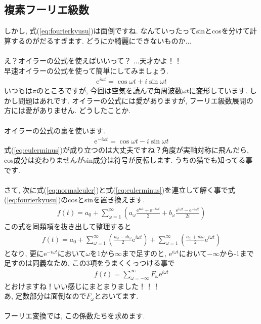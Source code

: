 \documentclass[11pt,a4paper]{jreport}
\begin{document}
\subsection{複素フーリエ級数}
しかし, 式(\ref{eq:fourierkyusu})は面倒ですね. なんていったってsinとcosを分けて計算するのがだるすぎます. どうにか綺麗にできないものか...\\
\\
え？オイラーの公式を使えばいいって？ ...天才かよ！！
\\
早速オイラーの公式を使って簡単にしてみましょう. 
\begin{eqnarray}
\mathrm{e}^{i\omega t} = \cos\omega t + i\sin\omega t
\label{eq:normaleuler}
\end{eqnarray}
いつもは$\pi$のところですが, 今回は空気を読んで角周波数$\omega t$に変形しています. しかし問題はあれです. オイラーの公式には愛がありますが, フーリエ級数展開の方には愛がありません. どうしたことか.\\
\\
オイラーの公式の裏を使います.
\begin{eqnarray}
\mathrm{e}^{-i\omega t} = \cos\omega t - i\sin\omega t
\label{eq:eulerminus}
\end{eqnarray}
式(\ref{eq:eulerminus})が成り立つのは大丈夫ですね？角度が実軸対称に飛んだら, cos成分は変わりませんがsin成分は符号が反転します. うちの猫でも知ってる事です.\\
\\
さて, 次に式(\ref{eq:normaleuler})と式(\ref{eq:eulerminus})を連立して解く事で式(\ref{eq:fourierkyusu})のcosとsinを置き換えます. \\
\begin{eqnarray}
f(t) = a_0 + \sum_{\omega=1}^\infty {(a_\omega \frac{\mathrm{e}^{i\omega t}+\mathrm{e}^{-i\omega t}}{2} + b_\omega \frac{\mathrm{e}^{i\omega t} - \mathrm{e}^{-i\omega t}}{2i})}
\label{eq:complexfourier}
\end{eqnarray}
この式を同類項を抜き出して整理すると
\begin{eqnarray}
f(t) = a_0 + \sum_{\omega=1}^\infty {(\frac{a_\omega - ib_\omega}{2}\mathrm{e}^{i\omega t})} + \sum_{\omega=1}^\infty {(\frac{a_\omega + ib\omega}{2}\mathrm{e}^{i\omega t})}
\label{eq:complexfourierkai}
\end{eqnarray}
となり, 更に$\mathrm{e}^{-i\omega t}$において$\omega$を1から$\infty$まで足すのと, $\mathrm{e}^{i\omega t}$において$-\infty$から-1まで足すのは同義なため, この3項をうまくくっつける事で
\begin{eqnarray}
f(t) = \sum_{\omega = -\infty}^\infty F_\omega \mathrm{e}^{i\omega t}
\end{eqnarray}
とおけますね！いい感じにまとまりました！！！\\
あ, 定数部分は面倒なので$F_\omega$とおいてます. \\
\\
フーリエ変換では, この係数たちを求めます. 
\end{document}
